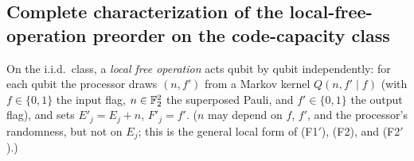 \subsection{Complete characterization of the local-free-operation preorder on the code-capacity class}

\begin{definition}\label{def:local}
On the i.i.d.\ class, a \emph{local free operation} acts qubit by qubit independently: for each qubit the processor draws $(n,f')$ from a Markov kernel
$Q(n,f'\mid f)$ (with $f\in\{0,1\}$ the input flag, $n\in\mathbb{F}_2^2$ the superposed Pauli, and $f'\in\{0,1\}$ the output flag),
and sets $E'_j=E_j+n$, $F'_j=f'$. ($n$ may depend on $f$, $f'$, and the processor's randomness, but not on $E_j$; this is the general local form of (F1$'$), (F2), and (F2$'$).)
\end{definition}

